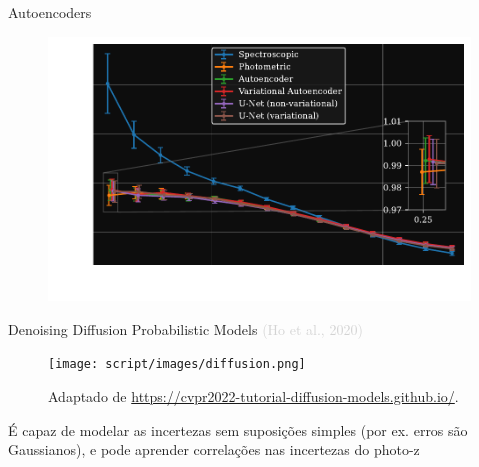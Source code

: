 \begin{frame}[c]{Autoencoders}
    \begin{figure}
        \centering
        \includegraphics[height=7cm]{script/images/2pcf_compare_corrfunc.pdf}
    \end{figure}
\end{frame}

\begin{frame}[c]{Denoising Diffusion Probabilistic Models  {\small \textcolor{LightGray}{(Ho et al., 2020)}}}
    \begin{figure}
        \centering
        \texttt{[image: script/images/diffusion.png]}
        \caption{Adaptado de \url{https://cvpr2022-tutorial-diffusion-models.github.io/}.}
    \end{figure}

    \centering
    \begin{splusbox}{}
        É capaz de modelar as incertezas sem suposições simples (por ex. erros são Gaussianos), e pode aprender correlações nas incertezas do photo-z
    \end{splusbox}
\end{frame}


